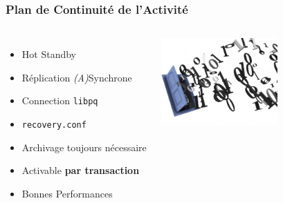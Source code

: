 \documentclass[english]{beamer}
\begin{document}
\begin{frame}[fragile]
  \frametitle{Plan de Continuité de l'Activité}

  \linebreak

\begin{columns}[c]

  \begin{itemize}
   \item<1-> \alert{Hot Standby}
   \item<2-> Réplication \textit{(A)}Synchrone
   \item<2-> Connection \texttt{libpq}
   \item<3-> \texttt{recovery.conf}
   \item<3-> Archivage toujours nécessaire
   \item<3-> Activable \textbf{par transaction}
   \item<4-> Bonnes Performances
  \end{itemize}  

\includegraphics[height=9em]{bits.jpeg}
\end{columns}
\end{frame}

\end{document}
